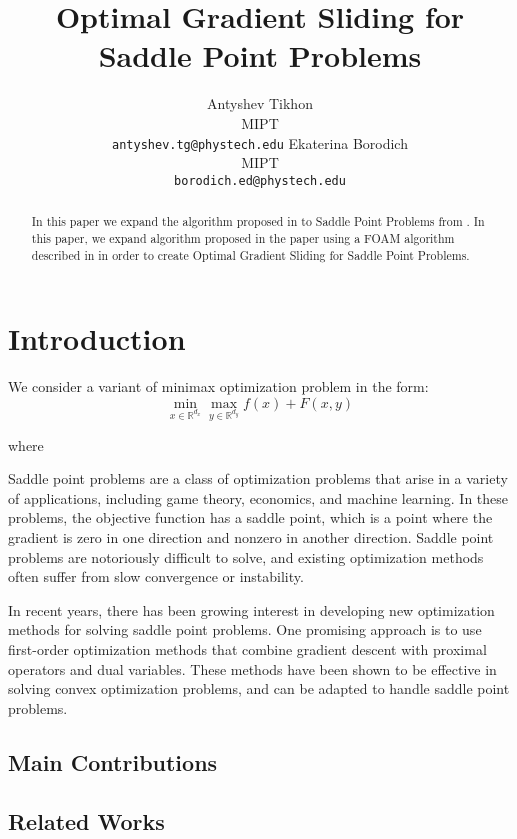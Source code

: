\documentclass[12pt]{article}
\title{Optimal Gradient Sliding for Saddle Point Problems}
\author{ Antyshev Tikhon\\
	MIPT\\
	\texttt{antyshev.tg@phystech.edu}
\And
	  Ekaterina Borodich\\
	  MIPT\\
	 \texttt{borodich.ed@phystech.edu} \\
}
\date{}
\theoremstyle{definition}
\theoremstyle{remark}
\begin{document}
\maketitle

\begin{abstract}
In this paper we expand the algorithm proposed in \cite{KovBorGas2022} to Saddle Point Problems from \cite{KovGas2022}. 
 In this paper, we expand algorithm proposed in the paper \cite{KovBorGas2022} using a FOAM algorithm described in \cite{KovGas2022} in order to create Optimal Gradient Sliding for Saddle Point Problems.
\end{abstract}



\section{Introduction}
We consider a variant of minimax optimization problem in the form:
\begin{equation}
    \min\limits_{x \in \mathbb{R}^{d_x}}\max\limits_{y \in \mathbb{R}^{d_y}}f(x) + F(x, y)
\end{equation}

where $$


Saddle point problems are a class of optimization problems that arise in a variety of applications, including game theory, economics, and machine learning. In these problems, the objective function has a saddle point, which is a point where the gradient is zero in one direction and nonzero in another direction. Saddle point problems are notoriously difficult to solve, and existing optimization methods often suffer from slow convergence or instability.

In recent years, there has been growing interest in developing new optimization methods for solving saddle point problems. One promising approach is to use first-order optimization methods that combine gradient descent with proximal operators and dual variables. These methods have been shown to be effective in solving convex optimization problems, and can be adapted to handle saddle point problems.

\subsection{Main Contributions}

\subsection{Related Works}
\end{document}
